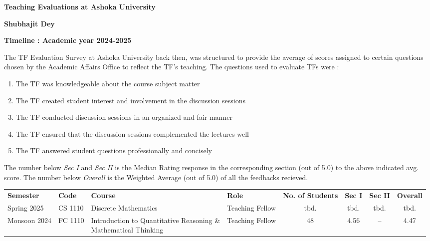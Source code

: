 \documentclass[12pt]{article}
\begin{document}
\begin{center}
    \Large{\textbf{Teaching Evaluations at Ashoka University}}\\
    \medskip

    \large{\textbf{Shubhajit Dey}}
\end{center}

\textbf{Timeline : Academic year 2024-2025}

The TF Evaluation Survey at Ashoka University back then, was structured to provide
the average of scores assigned to certain questions chosen by the Academic Affairs
Office to reflect the TF's teaching. The questions used to evaluate
TFs were :
\begin{enumerate}[noitemsep]
    \item The TF was knowledgeable about the course subject matter
    \item The TF created student interest and involvement in the discussion sessions
    \item The TF conducted discussion sessions in an organized and fair manner
    \item The TF ensured that the discussion sessions complemented the lectures well
    \item The TF answered student questions professionally and concisely
\end{enumerate}
The number below \textit{Sec I} and \textit{Sec II} is the Median Rating response
in the corresponding section (out of 5.0) to the above indicated avg. score. The number
below \textit{Overall} is the Weighted Average (out of 5.0) of all the feedbacks
recieved.
\begin{table}[H]
    \centering
    \begin{tabular}{llllcccc}
        \rowcolor{paynes.gray!20}
        \textbf{Semester} & \textbf{Code}& \textbf{Course} & \textbf{Role} & \textbf{No. of Students} & \textbf{Sec I} & \textbf{Sec II} & \textbf{Overall}\\
        Spring 2025 & CS 1110 & Discrete Mathematics & Teaching Fellow & tbd. & tbd. & tbd. & tbd.\\
        Monsoon 2024 & FC 1110 &\makecell[l]{Introduction to Quantitative Reasoning \&\\Mathematical Thinking} & Teaching Fellow & 48 & 4.56 & -- & 4.47
    \end{tabular}
\end{table}
\end{document}
